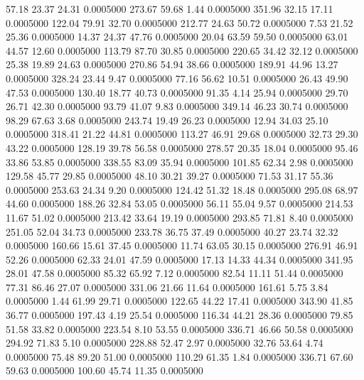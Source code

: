   57.18   23.37   24.31   0.0005000
 273.67   59.68    1.44   0.0005000
 351.96   32.15   17.11   0.0005000
 122.04   79.91   32.70   0.0005000
 212.77   24.63   50.72   0.0005000
   7.53   21.52   25.36   0.0005000
  14.37   24.37   47.76   0.0005000
  20.04   63.59   59.50   0.0005000
  63.01   44.57   12.60   0.0005000
 113.79   87.70   30.85   0.0005000
 220.65   34.42   32.12   0.0005000
  25.38   19.89   24.63   0.0005000
 270.86   54.94   38.66   0.0005000
 189.91   44.96   13.27   0.0005000
 328.24   23.44    9.47   0.0005000
  77.16   56.62   10.51   0.0005000
  26.43   49.90   47.53   0.0005000
 130.40   18.77   40.73   0.0005000
  91.35    4.14   25.94   0.0005000
  29.70   26.71   42.30   0.0005000
  93.79   41.07    9.83   0.0005000
 349.14   46.23   30.74   0.0005000
  98.29   67.63    3.68   0.0005000
 243.74   19.49   26.23   0.0005000
  12.94   34.03   25.10   0.0005000
 318.41   21.22   44.81   0.0005000
 113.27   46.91   29.68   0.0005000
  32.73   29.30   43.22   0.0005000
 128.19   39.78   56.58   0.0005000
 278.57   20.35   18.04   0.0005000
  95.46   33.86   53.85   0.0005000
 338.55   83.09   35.94   0.0005000
 101.85   62.34    2.98   0.0005000
 129.58   45.77   29.85   0.0005000
  48.10   30.21   39.27   0.0005000
  71.53   31.17   55.36   0.0005000
 253.63   24.34    9.20   0.0005000
 124.42   51.32   18.48   0.0005000
 295.08   68.97   44.60   0.0005000
 188.26   32.84   53.05   0.0005000
  56.11   55.04    9.57   0.0005000
 214.53   11.67   51.02   0.0005000
 213.42   33.64   19.19   0.0005000
 293.85   71.81    8.40   0.0005000
 251.05   52.04   34.73   0.0005000
 233.78   36.75   37.49   0.0005000
  40.27   23.74   32.32   0.0005000
 160.66   15.61   37.45   0.0005000
  11.74   63.05   30.15   0.0005000
 276.91   46.91   52.26   0.0005000
  62.33   24.01   47.59   0.0005000
  17.13   14.33   44.34   0.0005000
 341.95   28.01   47.58   0.0005000
  85.32   65.92    7.12   0.0005000
  82.54   11.11   51.44   0.0005000
  77.31   86.46   27.07   0.0005000
 331.06   21.66   11.64   0.0005000
 161.61    5.75    3.84   0.0005000
   1.44   61.99   29.71   0.0005000
 122.65   44.22   17.41   0.0005000
 343.90   41.85   36.77   0.0005000
 197.43    4.19   25.54   0.0005000
 116.34   44.21   28.36   0.0005000
  79.85   51.58   33.82   0.0005000
 223.54    8.10   53.55   0.0005000
 336.71   46.66   50.58   0.0005000
 294.92   71.83    5.10   0.0005000
 228.88   52.47    2.97   0.0005000
  32.76   53.64    4.74   0.0005000
  75.48   89.20   51.00   0.0005000
 110.29   61.35    1.84   0.0005000
 336.71   67.60   59.63   0.0005000
 100.60   45.74   11.35   0.0005000
